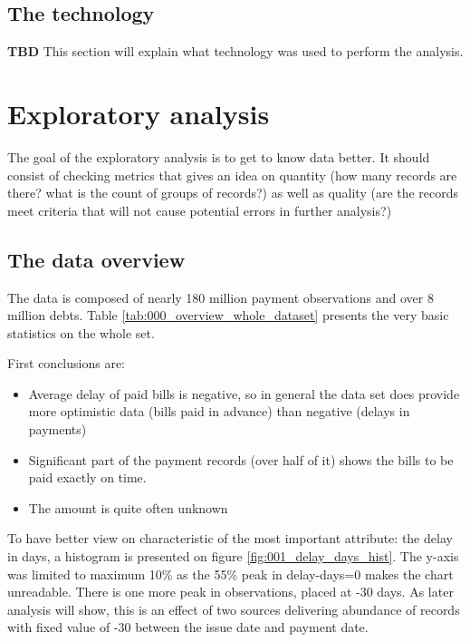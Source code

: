 \documentclass{article}
\begin{document}
\pagebreak

\subsection{The technology}

\textbf{TBD} This section will explain what technology was used to perform the analysis.

\section{Exploratory analysis}

The goal of the exploratory analysis is to get to know data better.
It should consist of checking metrics that gives an idea on quantity (how many records are there? what is the count of groups of records?) as well as quality (are the records meet criteria that will not cause potential errors in further analysis?)

\subsection{The data overview}

The data is composed of nearly 180 million payment observations and over 8 million debts.
Table \ref{tab:000_overview_whole_dataset} presents the very basic statistics on the whole set. \par

First conclusions are:
\begin{itemize}
    \item Average delay of paid bills is negative, so in general the data set does provide more optimistic data (bills paid in advance) than negative (delays in payments)
    \item Significant part of the payment records (over half of it) shows the bills to be paid exactly on time.
    \item The amount is quite often unknown
\end{itemize}

To have better view on characteristic of the most important attribute: the delay in days, a histogram is presented on figure \ref{fig:001_delay_days_hist}.
The y-axis was limited to maximum 10\% as the 55\% peak in delay-days=0 makes the chart unreadable.
There is one more peak in observations, placed at -30 days.
As later analysis will show, this is an effect of two sources delivering abundance of records with fixed value of -30 between the issue date and payment date.\par
\end{document}
